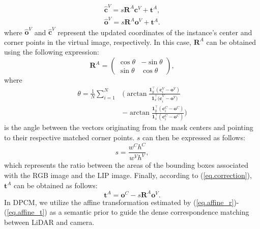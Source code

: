 \begin{equation}
\begin{aligned}
\hat{\boldsymbol{c}}^V = s\boldsymbol{R}^A \boldsymbol{c}^V + \boldsymbol{t}^A, \\
\hat{\boldsymbol{o}}^V = s\boldsymbol{R}^A \boldsymbol{o}^V + \boldsymbol{t}^A. 
\end{aligned}
\label{eq.correction}
\end{equation}
where $\hat{\boldsymbol{o}}^V$ and $\hat{\boldsymbol{c}}^V$ represent the updated coordinates of the instance's center and corner points in the virtual image, respectively.
In this case, $\boldsymbol{R}^A$ can be obtained using the following expression:
\begin{equation}
\label{eq.affine_r}
\boldsymbol{R}^A = 
\begin{pmatrix}
\cos{\theta} & -\sin{\theta} \\
\sin{\theta} & \cos{\theta}
\end{pmatrix},
\end{equation}
where 
\begin{equation}
\begin{aligned}
{\theta} = \frac{1}{N}\sum_{i=1}^{N}&{\bigg(\arctan{\frac{\boldsymbol{1}_y^\top({{\boldsymbol{c}}}^V_i  - {{\boldsymbol{o}}^V})}{\boldsymbol{1}_x^\top{({\boldsymbol{c}}}^V_i - {{\boldsymbol{o}}^V})}}}\\
&  - \arctan{\frac{\boldsymbol{1}_y^\top({{\boldsymbol{c}}}^C_i - {{\boldsymbol{o}}^C})}{\boldsymbol{1}_x^\top({{\boldsymbol{c}}}^C_i - {{\boldsymbol{o}}^C})}}\bigg)
\end{aligned}
\label{eq.affine_theta}
\end{equation}
is the angle between the vectors originating from the mask centers and pointing to their respective matched corner points. $s$ can then be expressed as follows:
\begin{equation}
s = \frac{w^Ch^C}{w^Vh^V},
\label{eq.affine_s}
\end{equation}
which represents the ratio between the areas of the bounding boxes associated with the RGB image and the LIP image. Finally, according to (\ref{eq.correction}), $\boldsymbol{t}^A$ can be obtained as follows:
\begin{equation}
\boldsymbol{t}^A = {{\boldsymbol{o}}^C} - s\boldsymbol{R}^A{{\boldsymbol{o}}^V}.
\label{eq.affine_t}
\end{equation}
In DPCM, we utilize the affine transformation estimated by (\ref{eq.affine_r})-(\ref{eq.affine_t}) as a semantic prior to guide the dense correspondence matching between LiDAR and camera.

